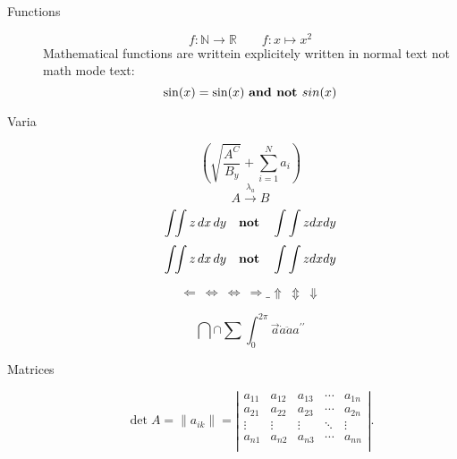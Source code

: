 \documentclass[10pt,a4paper]{scrartcl}
\begin{document}
\begin{description}
\item[Functions]
\[ f : \mathbb{N} \to \mathbb{R} \qquad f : x \mapsto x^2\]
Mathematical functions are writtein explicitely written in normal text not
math mode text:
\[ \sin(x) = \text{sin}(x) \text{ {\bf and not }} sin(x)\]

\item[Varia]
\[ \left( \sqrt{\frac{A^C}{B_y}} +	 \sum_{i=1}^N a_i\right) \]
\[ A \stackrel {\lambda_a} {\longrightarrow} B \]
\[ \int \! \! \int z\,dx \, dy \quad \mbox {\bf not} \quad \int\int z dx dy \]
\[ \int \! \! \int z\,dx \, dy \quad \mbox {\bf not} \quad \int\int z dx dy \]
				
{\Large
\[ \Leftarrow \  \Leftrightarrow \  \Longleftrightarrow \  \Rightarrow \_ 
    \Uparrow \  \Updownarrow \  \Downarrow	\]}
				
\[\bigcap \cap \sum \int_0^{2\pi} \vec{a} \dot{a} \ddot{a} a^{\prime \prime} \]


\item[Matrices]
\[ \det A = \| a_{ik} \| =
\left| \begin{array}{ccccc}
    a_{11} & a_{12} & a_{13} &  \cdots & a_{1n} \\
    a_{21} & a_{22} & a_{23} &  \cdots & a_{2n} \\
    \vdots  & \vdots  & \vdots  & \ddots & \vdots\\
    a_{n1} & a_{n2} & a_{n3} &  \cdots & a_{nn} \\
\end{array} \right| . \]

\end{description}

\end{document}
